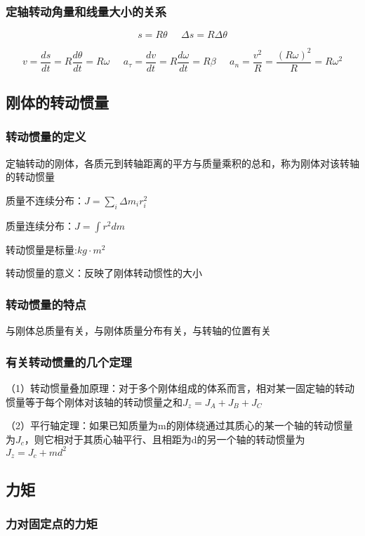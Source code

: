 \documentclass[UTF8]{article}
\begin{document}
\subsubsection{定轴转动角量和线量大小的关系}

    \[s = R\theta\;\;\;\;\;\Delta s = R\Delta\theta\]

    \[v = \frac{ds}{dt} = R\frac{d\theta}{dt} = R\omega\;\;\;\;\;a_\tau = \frac{dv}{dt} = R\frac{d\omega}{dt} = R\beta\;\;\;\;\;a_n = \frac{v^2}{R} = \frac{(R\omega)^2}{R} = R\omega^2\]
\subsection{刚体的转动惯量}
\subsubsection{转动惯量的定义}

    定轴转动的刚体，各质元到转轴距离的平方与质量乘积的总和，称为刚体对该转轴的转动惯量

    质量不连续分布：$J = \sum_i \Delta m_ir_i^2$

    质量连续分布：$J = \int r^2dm$

    转动惯量是标量\;\;\;\;\;[SI]:$kg\cdot m^2$

    转动惯量的意义：反映了刚体转动惯性的大小

\subsubsection{转动惯量的特点}

    与刚体总质量有关，与刚体质量分布有关，与转轴的位置有关

\subsubsection{有关转动惯量的几个定理}

    （1）转动惯量叠加原理：对于多个刚体组成的体系而言，相对某一固定轴的转动惯量等于每个刚体对该轴的转动惯量之和$J_z = J_A + J_B + J_C$

    （2）平行轴定理：如果已知质量为m的刚体绕通过其质心的某一个轴的转动惯量为$J_c$，则它相对于其质心轴平行、且相距为d的另一个轴的转动惯量为$J_z = J_c + md^2$

\subsection{力矩}
\subsubsection{力对固定点的力矩}
\end{document}
